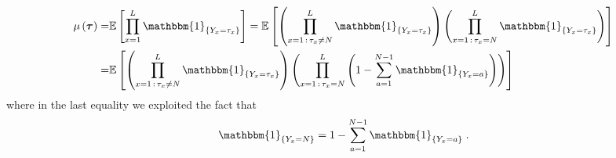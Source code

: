 \documentclass[10pt]{article}
\numberwithin{equation}{section}
\numberwithin{equation}{subsection}
\newcommand{\dt}{\;.}
\begin{document}
\begin{align}
	\mu\left(\bm{\tau}\right)=&\mathbb{E}\left[\prod_{x=1}^{L}\mathbbm{1}_{\{Y_{x}=\tau_{x}\}}\right]
	=\mathbb{E}\left[\left(\prod_{x=1\,:\,\tau_{x}\neq N}^{L}\mathbbm{1}_{\{Y_{x}=\tau_{x}\}}\right)\left(\prod_{x=1\,:\,\tau_{x}=N}^{L}\mathbbm{1}_{\{Y_{x}=\tau_x\}}\right)\right]\nonumber\\
	=&\mathbb{E}\left[\left(\prod_{x=1\,:\,\tau_{x}\neq N}^{L}\mathbbm{1}_{\{Y_{x}=\tau_{x}\}}\right)\left(\prod_{x=1\,:\,\tau_{x}=N}^{L}\left(1-\sum_{a=1}^{N-1}\mathbbm{1}_{\{Y_{x}=a\}}\right)\right)\right]
\end{align}
where in the last equality we exploited the fact that 
\begin{equation}\label{prova}			\mathbbm{1}_{\{Y_{x}=N\}}=1-\sum_{a=1}^{N-1}\mathbbm{1}_{\{Y_{x}=a\}}\dt
\end{equation}
\end{document}
